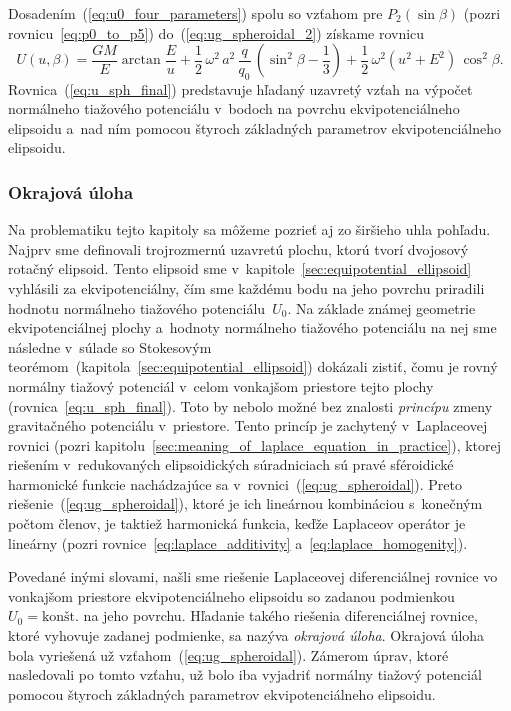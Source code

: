 \documentclass[a4paper, 12pt]{book}
\begin{document}
Dosadením~(\ref{eq:u0_four_parameters}) spolu so vzťahom pre $P_2(\sin\beta)$ 
(pozri rovnicu~\ref{eq:p0_to_p5}) do~(\ref{eq:ug_spheroidal_2}) získame rovnicu
%
\begin{equation}
\label{eq:u_sph_final}
U(u, \beta) = \frac{GM}{E} \arctan\frac{E}{u} + \frac{1}{2} \, \omega^2 \, a^2 
\, \frac{q}{q_0} \, \left( \sin^2\beta - \frac{1}{3} \right) + \frac{1}{2} \, 
\omega^2 (u^2 + E^2) \, \cos^2\beta{.}
\end{equation}
%
Rovnica~(\ref{eq:u_sph_final}) predstavuje hľadaný uzavretý vzťah na výpočet 
normálneho tiažového potenciálu v~bodoch na povrchu ekvipotenciálneho elipsoidu 
a~nad ním pomocou štyroch základných parametrov ekvipotenciálneho elipsoidu.



\subsubsection{Okrajová úloha}
\label{sec:u_boundary_value_problem}

Na problematiku tejto kapitoly sa môžeme pozrieť aj zo širšieho uhla pohľadu.  
Najprv sme definovali trojrozmernú uzavretú plochu, ktorú tvorí dvojosový 
rotačný elipsoid.  Tento elipsoid sme 
v~kapitole~\ref{sec:equipotential_ellipsoid} vyhlásili za ekvipotenciálny, čím 
sme každému bodu na jeho povrchu priradili hodnotu normálneho tiažového 
potenciálu~$U_0$.  Na základe známej geometrie ekvipotenciálnej plochy 
a~hodnoty normálneho tiažového potenciálu na nej sme následne v~súlade so 
Stokesovým teorémom~(kapitola~\ref{sec:equipotential_ellipsoid}) dokázali 
zistiť, čomu je rovný normálny tiažový potenciál v~celom vonkajšom priestore 
tejto plochy (rovnica~\ref{eq:u_sph_final}).  Toto by nebolo možné bez znalosti 
\emph{princípu} zmeny gravitačného potenciálu v~priestore.  Tento princíp je 
zachytený v~Laplaceovej rovnici (pozri 
kapitolu~\ref{sec:meaning_of_laplace_equation_in_practice}), ktorej riešením 
v~redukovaných elipsoidických súradniciach sú pravé sféroidické harmonické 
funkcie nachádzajúce sa v~rovnici~(\ref{eq:ug_spheroidal}).  Preto 
riešenie~(\ref{eq:ug_spheroidal}), ktoré je ich lineárnou kombináciou 
s~konečným počtom členov, je taktiež harmonická funkcia, keďže Laplaceov 
operátor je lineárny (pozri rovnice~\ref{eq:laplace_additivity} 
a~\ref{eq:laplace_homogenity}).

Povedané inými slovami, našli sme riešenie Laplaceovej diferenciálnej rovnice 
vo vonkajšom priestore ekvipotenciálneho elipsoidu so zadanou podmienkou~$U_0 
= \textrm{konšt.}$ na jeho povrchu.  Hľadanie takého riešenia diferenciálnej 
rovnice, ktoré vyhovuje zadanej podmienke, sa nazýva \emph{okrajová úloha}.  
Okrajová úloha bola vyriešená už vzťahom~(\ref{eq:ug_spheroidal}).  Zámerom 
úprav, ktoré nasledovali po tomto vzťahu, už bolo iba vyjadriť normálny tiažový 
potenciál pomocou štyroch základných parametrov ekvipotenciálneho elipsoidu.
\end{document}
